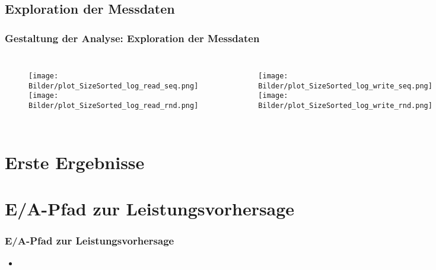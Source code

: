\documentclass{beamer}
\begin{document}
\subsection{Exploration der Messdaten}
\begin{frame}
\frametitle{Gestaltung der Analyse: Exploration der Messdaten}
\begin{columns}
	\begin{figure}
		\texttt{[image: Bilder/plot\_SizeSorted\_log\_read\_seq.png]}\\
		\texttt{[image: Bilder/plot\_SizeSorted\_log\_read\_rnd.png]}
	\end{figure}
	\begin{figure}
		\texttt{[image: Bilder/plot\_SizeSorted\_log\_write\_seq.png]}\\
		\texttt{[image: Bilder/plot\_SizeSorted\_log\_write\_rnd.png]}
	\end{figure}
\end{columns}
\end{frame}

\section{Erste Ergebnisse}

\section{E/A-Pfad zur Leistungsvorhersage}
\begin{frame}
\frametitle{E/A-Pfad zur Leistungsvorhersage}
\begin{itemize}
	\item 
\end{itemize}
\end{frame}
\end{document}
